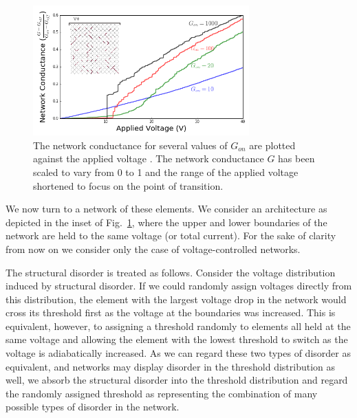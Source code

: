 \documentclass[aps,prl,reprint,groupedaddress]{revtex4-1}
\begin{document}
\begin{figure}
\includegraphics[width=8.3cm]{PT_Networks_Conductances-2.png}
\caption{The network conductance for several values of $G_{on}$ are plotted
against the applied voltage .  The network conductance $G$ has been scaled to
vary from 0 to 1 and the range of the applied voltage shortened to focus on
the point of transition. \label{Cond_fig}}
\end{figure}

We now turn to a network of these elements.  We consider an 
architecture as depicted in the inset of Fig.~\ref{Cond_fig}, where the upper and lower boundaries of the network are held to the same
voltage (or total current). For the sake of clarity from now on we consider only the
case of voltage-controlled networks. 


The structural disorder is treated as follows.  Consider the voltage
distribution induced by structural disorder.  If we could randomly assign
voltages directly
from this distribution, the element with the largest voltage drop in the
network would cross its threshold first as the voltage at the boundaries was
increased.  This is equivalent, however, to
assigning a threshold randomly to elements all held at the same voltage and
allowing the element with the lowest threshold to switch as the voltage is adiabatically 
increased.  As we can regard these two types of disorder as equivalent, and
networks may display disorder in the threshold distribution as well, we absorb
the structural disorder into the threshold distribution and regard the
randomly assigned threshold as representing the combination of many possible
types of disorder in the network.  
\end{document}
